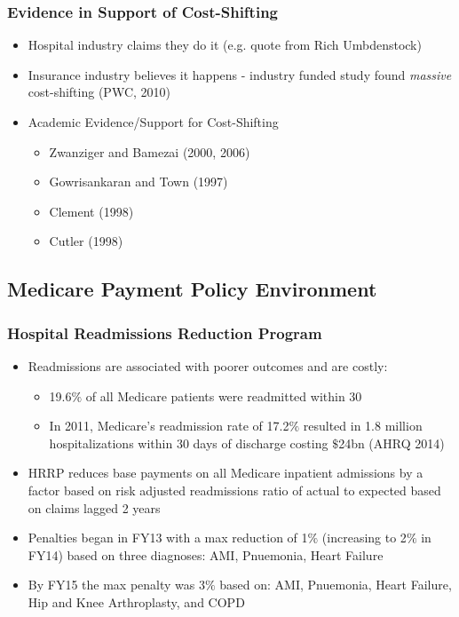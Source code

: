 \documentclass{beamer}
\begin{document}
\begin{frame}
\frametitle{Evidence in Support of Cost-Shifting}
\begin{itemize}
\item Hospital industry claims they do it (e.g. quote from Rich Umbdenstock)
\item Insurance industry believes it happens - industry funded study found \textit{massive} cost-shifting (PWC, 2010)
\item Academic Evidence/Support for Cost-Shifting
\begin{itemize}
\item Zwanziger and Bamezai (2000, 2006)
\item Gowrisankaran and Town (1997) 
\item Clement (1998) 
\item Cutler (1998)
\end{itemize}
\end{itemize}
\end{frame}

\subsection{Medicare Payment Policy Environment}

\begin{frame}
\frametitle{Hospital Readmissions Reduction Program}
\begin{itemize}
\item Readmissions are associated with poorer outcomes and are costly:  
\begin{itemize}
\item 19.6$\%$ of all Medicare patients were readmitted within 30  
\item In 2011, Medicare's readmission rate of 17.2$\%$ resulted in 1.8 million hospitalizations within 30 days of discharge costing $\$$24bn (AHRQ 2014) 
\end{itemize}
\item HRRP reduces base payments on all Medicare inpatient admissions by a factor based on risk adjusted readmissions ratio of actual to expected based on claims lagged 2 years 
\item Penalties began in FY13 with a max reduction of 1$\%$ (increasing to 2$\%$ in FY14) based on three diagnoses: AMI, Pnuemonia, Heart Failure 
\item By FY15 the max penalty was 3$\%$ based on: AMI, Pnuemonia, Heart Failure, Hip and Knee Arthroplasty, and COPD
\end{itemize}
\end{frame}
\end{document}
